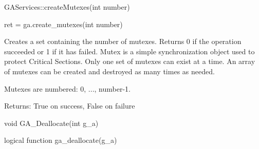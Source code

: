 \documentclass[12pt]{article}
\begin{document}
\begin{cxxapi}
\begin{cxxcode}
GAServices::createMutexes(int number)
\end{cxxcode}
\begin{funcargs}
\end{funcargs}
\end{cxxapi}

\begin{pyapi}
\begin{pycode}
ret = ga.create_mutexes(int number)
\end{pycode}
\begin{funcargs}
\end{funcargs}
\end{pyapi}

\wcoll

\begin{desc}

Creates a set containing the number of mutexes. Returns 0 if the operation
succeeded or 1 if it has failed. Mutex is a simple synchronization object used
to protect Critical Sections. Only one set of mutexes can exist at a time. An
array of mutexes can be created and destroyed as many times as needed.

Mutexes are numbered: 0, ..., number-1.

Returns: True on success, False on failure

\end{desc}



\begin{capi}
\begin{ccode}
void GA_Deallocate(int g_a)
\end{ccode}
\begin{funcargs}
\end{funcargs}
\end{capi}

\begin{fapi}
\begin{fcode}
logical function ga_deallocate(g_a)
\end{fcode}
\begin{funcargs}
\end{funcargs}
\end{fapi}
\end{document}
